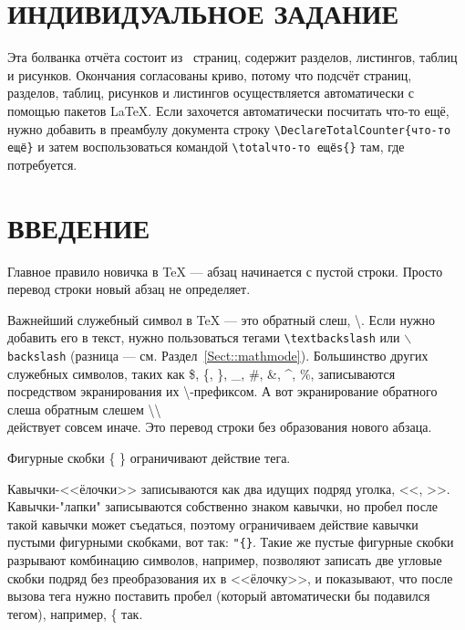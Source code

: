 \documentclass[14pt, russian]{scrartcl}
\newcommand{\anonsection}[1]{\cleardoublepage
\phantomsection
\addcontentsline{toc}{section}{\protect\numberline{}#1}
\section*{#1}\vspace*{2.5ex} %
}
\begin{document}

\setlength{\tabcolsep}{3pt}
\newpage
\setcounter{page}{2}
\section*{ИНДИВИДУАЛЬНОЕ ЗАДАНИЕ}

Эта болванка отчёта состоит из~\pageref{TotPages} страниц, содержит \totalsections{} разделов, \totallistings{} листингов, \totaltables{} таблиц и \totalfigures{} рисунков. Окончания согласованы криво, потому что подсчёт страниц, разделов, таблиц, рисунков и листингов осуществляется автоматически с помощью пакетов \LaTeX{}. Если захочется автоматически посчитать что-то ещё, нужно добавить в преамбулу документа строку \texttt{\textbackslash DeclareTotalCounter\{что-то ещё\}} и затем воспользоваться командой \texttt{\textbackslash totalчто-то ещёs\{\}} там, где потребуется.

\newpage
\renewcommand\contentsname{\hfill{\normalfont{СОДЕРЖАНИЕ}}\hfill}  %
\tableofcontents
\newpage
\anonsection{ВВЕДЕНИЕ}  %

Главное правило новичка в \TeX{} --- абзац начинается с пустой строки. Просто перевод строки новый абзац не определяет.

Важнейший служебный символ в \TeX{} --- это обратный слеш, \textbackslash. Если нужно добавить его в текст, нужно пользоваться тегами \texttt{\textbackslash textbackslash} или \texttt{$\backslash$backslash} (разница --- см. Раздел~\ref{Sect::mathmode}). Большинство других служебных символов, таких как \$, \{, \}, \_, \#, \&, \^{}, \%, записываются посредством экранирования их  \textbackslash -префиксом. А вот экранирование обратного слеша обратным слешем \textbackslash \textbackslash{} \\ действует совсем иначе. Это перевод строки без образования нового абзаца.

Фигурные скобки \{ \} ограничивают действие тега. 

Кавычки-<<ёлочки>> записываются как два идущих подряд уголка, <{}<, >{}>. Кавычки-"лапки"{} записываются собственно знаком кавычки, но пробел после такой кавычки может съедаться, поэтому ограничиваем действие кавычки пустыми фигурными скобками, вот так: \texttt{"\{\}}. Такие же пустые фигурные скобки разрывают комбинацию символов, например, позволяют записать две угловые скобки подряд без преобразования их в <<ёлочку>>, и показывают, что после вызова тега нужно поставить пробел (который автоматически бы подавился тегом), например, \{{} так.
\end{document}
